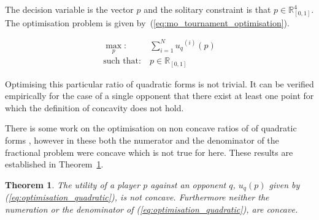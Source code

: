 \documentclass[10pt]{article}
\newcommand{\R}{\mathbb{R}}
\newtheorem{theorem}{Theorem}
\begin{document}
The decision variable is the vector \(p\) and the solitary constraint is
that \(p \in \R^4_{[0, 1]} \).
The optimisation problem is given by~(\ref{eq:mo_tournament_optimisation}).

\begin{equation}\label{eq:mo_tournament_optimisation}
    \begin{aligned}
    \max_p: & \ \sum_{i=1} ^ {N} {u_q}^{(i)} (p)
    \\
    \text{such that}: & \ p \in \R_{[0, 1]}
    \end{aligned}
\end{equation}

Optimising this particular ratio of quadratic forms is not trivial.
It can be verified empirically for the case of a single opponent that there
exist at
least one point for which the definition of concavity does not hold.

There is some work on the optimisation on non concave ratios of of quadratic forms
\cite{Beck2009, Hongyan2014}, however in these both the numerator and the denominator
of the fractional problem were concave which is not true for here.
These results are established in Theorem~\ref{theorem:concavity}.

\begin{theorem}\label{theorem:concavity}
    The utility of a player \(p\) against an opponent \(q\), \(u_q (p)\) given by
    (\ref{eq:optimisation_quadratic}), is not concave. Furthermore neither the
    numeration or the denominator of (\ref{eq:optimisation_quadratic}), are concave.
\end{theorem}
\end{document}
